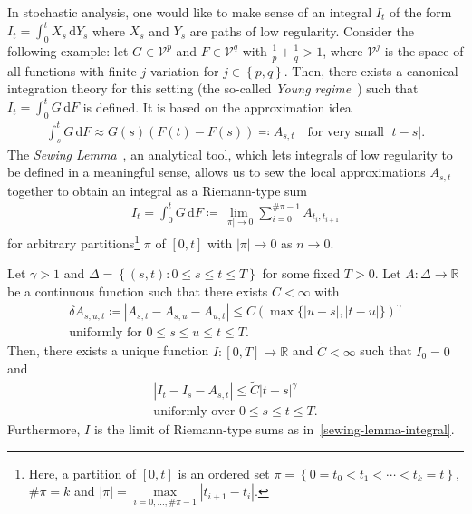 In stochastic analysis, one would like to make sense of an integral \(I_t\)  of the form \(I_t = \int^t_0 X_s \, \mathrm{d}Y_s\) where \(X_s\) and \(Y_s\) are paths of low regularity. Consider the following example: let \(G \in \mathcal{V}^p\) and \(F \in \mathcal{V}^q\) with \(\frac{1}{p} + \frac{1}{q} > 1\), where \(\mathcal{V}^j\) is the space of all functions with finite \(j\)-variation for \( j \in \left \{ p,q \right \} \). Then, there exists a canonical integration theory for this setting (the so-called \emph{Young regime}~\cite{Young1936AnIO}) such that \(I_t = \int^t_0 G \, \mathrm{d}F\) is defined. It is based on the approximation idea
\begin{align*}
    \int^t_s G \, \mathrm{d}F \approx G(s)(F(t) - F(s)) \eqqcolon A_{s,t} \quad \text{for very small \(|t-s|\)}.
\end{align*}
The \emph{Sewing Lemma}~\cite{GUBINELLI200486}, an analytical tool, which lets integrals of low regularity to be defined in a meaningful sense, allows us to sew the local approximations \(A_{s,t}\) together to obtain an integral as a Riemann-type sum
\begin{align}\label{sewing-lemma-integral}
    I_t = \int^t_0 G \, \mathrm{d}F \coloneqq \lim\limits_{|\pi| \to 0} \sum\limits_{i=0}^{\# \pi - 1} A_{t_i,t_{i+1}}
\end{align}
for arbitrary partitions\footnote{Here, a partition of \([0,t]\) is an ordered set \(\pi = \left \{ 0 = t_0 < t_1 < \cdots < t_k = t  \right \} \), \( \# \pi = k \) and \(|\pi| = \max\limits_{i=0, \ldots ,\# \pi - 1} |t_{i+1} - t_{i}|\).} \( \pi \) of \([0,t]\) with \(|\pi| \to 0\) as \(n \to 0\).
\begin{lemma}\label{first-sewing-lemma}
    Let \(\gamma > 1\) and \( \Delta = \left \{ (s,t) :  0 \leq s \leq t \leq T\right \} \) for some fixed \(T > 0\). Let \(A: \Delta \to \mathbb{R}\) be a continuous function such that there exists \( C <\infty \) with
    \begin{gather}
        \delta A_{s,u,t} \coloneqq |A_{s,t} - A_{s,u} - A_{u,t}| \leq C {(\max \{|u-s|,|t-u|\})}^\gamma \label{sewing-lemma-condition}\\
        \text{uniformly for \(0 \leq s \leq u \leq t \leq T\)}. \nonumber
    \end{gather} 
    Then, there exists a unique function \(I: [0,T] \to \mathbb{R}\) and \(\tilde C < {\infty}\)  such that \(I_0 = 0\) and 
    \begin{gather*}
        |I_t - I_s - A_{s,t}| \leq \tilde C|t-s|^\gamma \\
        \text{uniformly over \(0 \leq s \leq t \leq T\).}
    \end{gather*}  
    Furthermore, \(I\) is the limit of Riemann-type sums as in~\eqref{sewing-lemma-integral}.  
\end{lemma}

